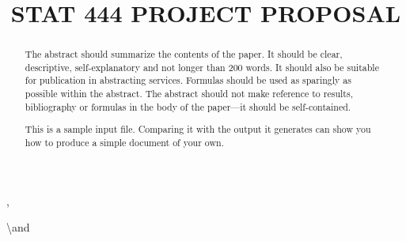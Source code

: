 \documentclass[aoas]{imsart}
\numberwithin{equation}{section}
\theoremstyle{plain}
\theoremstyle{remark}
\begin{document}
\begin{frontmatter}
\title{STAT 444 PROJECT PROPOSAL}



\begin{aug}


\author[A]{ 
  }
  ,
\author[B]{ 
  }
  \textbackslash and
\author[B]{ 
  }
  

\address[A]{Department, University or Company Name,
  }
\address[B]{Department, University or Company Name,
  }
\end{aug}

\begin{abstract}
The abstract should summarize the contents of the paper. It should be
clear, descriptive, self-explanatory and not longer than 200 words. It
should also be suitable for publication in abstracting services.
Formulas should be used as sparingly as possible within the abstract.
The abstract should not make reference to results, bibliography or
formulas in the body of the paper---it should be self-contained.

This is a sample input file. Comparing it with the output it generates
can show you how to produce a simple document of your own.
\end{abstract}


\begin{keyword}
\end{keyword}

\end{frontmatter}
\end{document}
